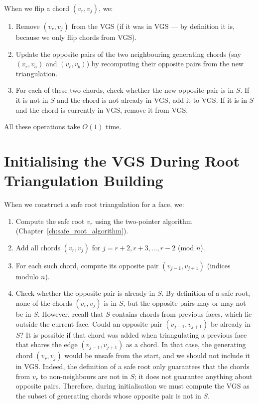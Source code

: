 When we flip a chord \((v_r, v_j)\), we:
\begin{enumerate}
    \item Remove \((v_r, v_j)\) from the VGS (if it was in VGS — by definition it is, because we only flip chords from VGS).
    \item Update the opposite pairs of the two neighbouring generating chords (say \((v_r, v_a)\) and \((v_r, v_b)\)) by recomputing their opposite pairs from the new triangulation.
    \item For each of these two chords, check whether the new opposite pair is in \(S\). 
    If it is not in \(S\) and the chord is not already in VGS, add it to VGS. 
    If it is in \(S\) and the chord is currently in VGS, remove it from VGS.
\end{enumerate}

All these operations take \(O(1)\) time.

\section{Initialising the VGS During Root Triangulation Building}
\label{sec:vgs_initialisation}

When we construct a safe root triangulation for a face, we:
\begin{enumerate}
    \item Compute the safe root \(v_r\) using the two-pointer algorithm (Chapter~\ref{ch:safe_root_algorithm}).
    \item Add all chords \((v_r, v_j)\) for \(j = r+2, r+3, \dots, r-2\) (mod \(n\)).
    \item For each such chord, compute its opposite pair \((v_{j-1}, v_{j+1})\) (indices modulo \(n\)).
    \item Check whether the opposite pair is already in \(S\). 
    By definition of a safe root, none of the chords \((v_r, v_j)\) is in \(S\), but the opposite pairs may or may not be in \(S\). 
    However, recall that \(S\) contains chords from previous faces, which lie outside the current face. 
    Could an opposite pair \((v_{j-1}, v_{j+1})\) be already in \(S\)? 
    It is possible if that chord was added when triangulating a previous face that shares the edge \((v_{j-1}, v_{j+1})\) as a chord. 
    In that case, the generating chord \((v_r, v_j)\) would be unsafe from the start, and we should not include it in VGS. 
    Indeed, the definition of a safe root only guarantees that the chords from \(v_r\) to non-neighbours are not in \(S\); it does not guarantee anything about opposite pairs. 
    Therefore, during initialisation we must compute the VGS as the subset of generating chords whose opposite pair is not in \(S\).
\end{enumerate}

